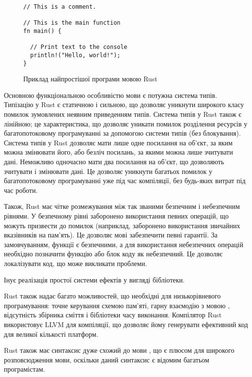 \documentclass[main.tex]{subfiles}
\begin{document}
\begin{figure}[h]
  \centering
  \begin{BVerbatim}
// This is a comment.

// This is the main function
fn main() {

  // Print text to the console
  println!("Hello, world!");
}
  \end{BVerbatim}
  \caption{Приклад найпростішої програми мовою Rust}\label{example:rust}
\end{figure}

Основною функціональною особливістю мови є потужна система типів. Типізацію у Rust є статичною і сильною, що дозволяє уникнути широкого класу помилок зумовлених неявним приведенням типів. Система типів у Rust також є лінійною; це характеристика, що дозволяє уникати помилок розділення ресурсів у багатопотоковому програмуванні за допомогою системи типів (без блокування). Система типів у Rust дозволяє мати лише одне посилання на об'єкт, за яким можна змінювати його, або безліч посилань, за якими можна лише зчитувати дані. Неможливо одночасно мати два посилання на об'єкт, що дозволяють зчитувати і змінювати дані. Це дозволяє уникнути багатьох помилок у багатопотоковому програмуванні уже під час компіляції, без будь-яких витрат під час роботи.

Також, Rust має чітке розмежування між так званими безпечним і небезпечним рівнями. У безпечному рівні заборонено використання певних операцій, що можуть призвести до помилок (наприклад, заборонено використання звичайних вказівників на пам'ять). Це дозволяє мові забезпечити певні гарантії. За замовчуванням, функції є безпечними, а для використання небезпечних операцій необхідно позначити функцію або блок коду як небезпечний. Це дозволяє локалізувати код, що може викликати проблеми.

Інує реалізація простої системи ефектів у вигляді бібліотеки.

Rust також надає багато можливостей, що необхідні для низькорівневого програмування: точне керування схемою пам'яті, гарну взаємодію з мовою \LangC{}, відсутність збірника сміття і бібліотеки часу виконання. Компілятор Rust використовує LLVM\cite{llvm} для компіляції, що дозволяє йому генерувати ефективний код для великої кількості платформ.

Rust також має синтаксис дуже схожий до мови \LangC{}, що є плюсом для широкого розповсюдження мови, оскільки даний синтаксис є відомим багатьом програмістам.

\chapterconslusions{}
\end{document}
